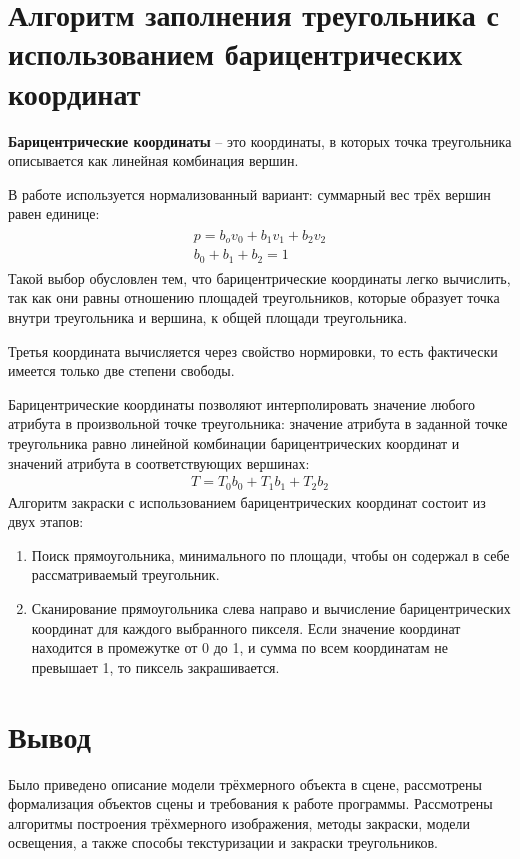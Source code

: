 \section{Алгоритм заполнения треугольника с использованием барицентрических координат}
\textbf{Барицентрические координаты} -- это координаты, в которых точка треугольника описывается как линейная комбинация вершин.

В работе используется нормализованный вариант: суммарный вес трёх вершин равен единице:
\begin{align}
	\begin{gathered}
	p = b_o v_0 + b_1 v_1 + b_2 v_2\\
	b_0 + b_1 + b_2 = 1
	\end{gathered}
\end{align}
Такой выбор обусловлен тем, что барицентрические координаты легко вычислить, так как они равны отношению площадей треугольников, которые образует точка внутри треугольника и вершина, к общей площади треугольника.

Третья координата вычисляется через свойство нормировки, то есть фактически имеется только две степени свободы.

Барицентрические координаты позволяют интерполировать значение любого атрибута в произвольной точке треугольника: значение атрибута в заданной точке треугольника равно линейной комбинации барицентрических координат и значений атрибута в соответствующих вершинах:
\begin{align}
T = T_0 b_0 + T_1 b_1 + T_2 b_2
\end{align}
Алгоритм закраски с использованием барицентрических координат состоит из двух этапов:
\newpage
\begin{enumerate}
\item Поиск прямоугольника, минимального по площади, чтобы он содержал в себе рассматриваемый треугольник.
\item Сканирование прямоугольника слева направо и вычисление барицентрических координат для каждого выбранного пикселя. Если значение координат находится в промежутке от 0 до 1, и сумма по всем координатам не превышает 1, то пиксель закрашивается.
\end{enumerate}
\section{Вывод}
Было приведено описание модели трёхмерного объекта в сцене, рассмотрены формализация объектов сцены и требования к работе программы. Рассмотрены алгоритмы построения трёхмерного изображения, методы закраски, модели освещения, а также способы текстуризации и закраски треугольников.